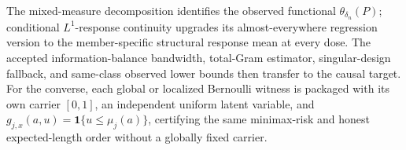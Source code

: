 The mixed-measure decomposition identifies the observed functional \(\theta_{\delta_n}(P)\); conditional \(L^1\)-response continuity upgrades its almost-everywhere regression version to the member-specific structural response mean at every dose. The accepted information-balance bandwidth, total-Gram estimator, singular-design fallback, and same-class observed lower bounds then transfer to the causal target. For the converse, each global or localized Bernoulli witness is packaged with its own carrier \([0,1]\), an independent uniform latent variable, and \(g_{j,x}(a,u)=\mathbf 1\{u\leq\mu_j(a)\}\), certifying the same minimax-risk and honest expected-length order without a globally fixed carrier.